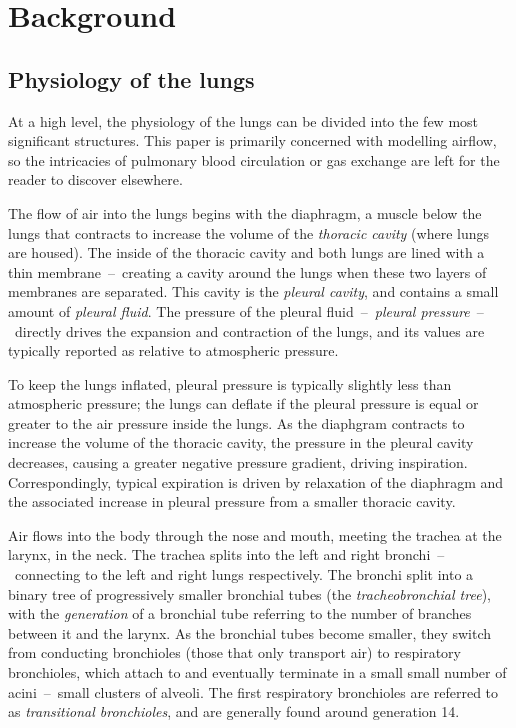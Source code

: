 %
\section{Background}

\subsection{Physiology of the lungs}

At a high level, the physiology of the lungs can be divided into the few most significant
structures. This paper is primarily concerned with modelling airflow, so the intricacies of
pulmonary blood circulation or gas exchange are left for the reader to discover elsewhere.

\breakpars

The flow of air into the lungs begins with the diaphragm, a muscle below the lungs that contracts to
increase the volume of the \textit{thoracic cavity} (where lungs are housed). The inside of the
thoracic cavity and both lungs are lined with a thin membrane~--~creating a cavity around the lungs
when these two layers of membranes are separated. This cavity is the \textit{pleural cavity}, and
contains a small amount of \textit{pleural fluid}. The pressure of the pleural
fluid~--~\textit{pleural pressure}~--~directly drives the expansion and contraction of the lungs,
and its values are typically reported as relative to atmospheric pressure.

To keep the lungs inflated, pleural pressure is typically slightly less than atmospheric pressure;
the lungs can deflate if the pleural pressure is equal or greater to the air pressure inside the
lungs. As the diaphgram contracts to increase the volume of the thoracic cavity, the pressure in the
pleural cavity decreases, causing a greater negative pressure gradient, driving inspiration.
Correspondingly, typical expiration is driven by relaxation of the diaphragm and the associated
increase in pleural pressure from a smaller thoracic cavity.

Air flows into the body through the nose and mouth, meeting the trachea at the larynx, in the neck.
The trachea splits into the left and right bronchi~--~connecting to the left and right lungs
respectively. The bronchi split into a binary tree of progressively smaller bronchial tubes (the
\textit{tracheobronchial tree}), with the \textit{generation} of a bronchial tube referring to the
number of branches between it and the larynx. As the bronchial tubes become smaller, they switch
from conducting bronchioles (those that only transport air) to respiratory bronchioles, which attach
to and eventually terminate in a small small number of acini~--~small clusters of alveoli. The
first respiratory bronchioles are referred to as \textit{transitional bronchioles}, and are
generally found around generation 14.\cite{HaefeliBleuerWeibel1988}

